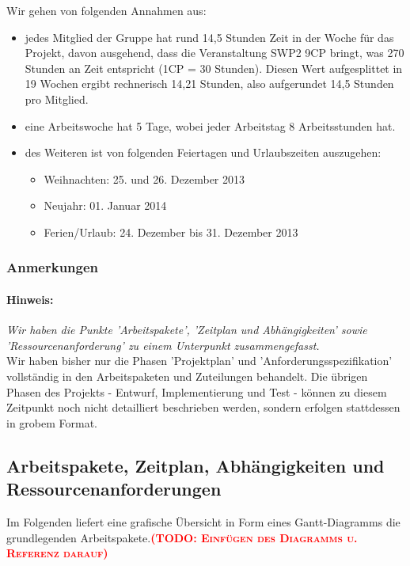 \documentclass[fontsize=12pt,paper=a4,twoside]{scrartcl}
\newcommand{\todo}[1]{\textbf{\textsc{\textcolor{red}{(TODO: #1)}}}}
\begin{document}
Wir gehen von folgenden Annahmen aus: \\
\begin{itemize}
\item jedes Mitglied der Gruppe hat rund 14,5 Stunden Zeit in der Woche für das Projekt, davon ausgehend, dass die Veranstaltung SWP2 9CP bringt, was 270 Stunden an Zeit entspricht (1CP = 30 Stunden). Diesen Wert aufgesplittet in 19 Wochen ergibt rechnerisch 14,21 Stunden, also aufgerundet 14,5 Stunden pro Mitglied.

\item eine Arbeitswoche hat 5 Tage, wobei jeder Arbeitstag 8 Arbeitsstunden hat.

\item des Weiteren ist von folgenden Feiertagen und Urlaubszeiten auszugehen:
\begin{itemize}
\item Weihnachten: 25. und 26. Dezember 2013
\item Neujahr: 01. Januar 2014
\item Ferien/Urlaub: 24. Dezember bis 31. Dezember 2013
\end{itemize}
\end{itemize}
\subsubsection{Anmerkungen}\label{aps}
\paragraph{Hinweis:} \textit{Wir haben die Punkte 'Arbeitspakete', 'Zeitplan und Abhängigkeiten' sowie 'Ressourcenanforderung' zu einem Unterpunkt zusammengefasst.}\\

Wir haben bisher nur die Phasen 'Projektplan' und 'Anforderungsspezifikation' vollständig in den Arbeitspaketen und Zuteilungen behandelt. Die übrigen Phasen des Projekts - Entwurf, Implementierung und Test - können zu diesem Zeitpunkt noch nicht detailliert beschrieben werden, sondern erfolgen stattdessen in grobem Format. \\

\subsection{Arbeitspakete, Zeitplan, Abhängigkeiten und Ressourcenanforderungen}\label{aps}

Im Folgenden liefert eine grafische Übersicht in Form eines Gantt-Diagramms die grundlegenden Arbeitspakete.\todo{Einfügen des Diagramms u. Referenz darauf}\\
\end{document}
